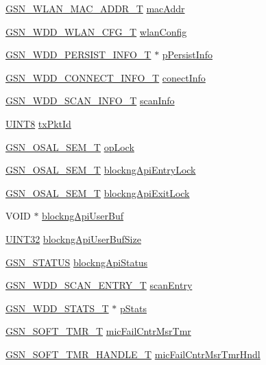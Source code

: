 \begin{DoxyCompactItemize}
\hyperlink{a00416}{GSN\_\-WLAN\_\-MAC\_\-ADDR\_\-T} \hyperlink{a00108_ab623c15c7dc79be51bcdaa04fba67d90}{macAddr}
\item 
\hyperlink{a00302}{GSN\_\-WDD\_\-WLAN\_\-CFG\_\-T} \hyperlink{a00108_a003dc28005c9736d062b26e04ed75e68}{wlanConfig}
\item 
\hyperlink{a00282}{GSN\_\-WDD\_\-PERSIST\_\-INFO\_\-T} $\ast$ \hyperlink{a00108_a2352b6f9dfcf66ea61b2b20760fed0c4}{pPersistInfo}
\item 
\hyperlink{a00273}{GSN\_\-WDD\_\-CONNECT\_\-INFO\_\-T} \hyperlink{a00108_ad5c6e8d12ebc9a7497ba35d144a5f19f}{conectInfo}
\item 
\hyperlink{a00285}{GSN\_\-WDD\_\-SCAN\_\-INFO\_\-T} \hyperlink{a00108_a32138fdd69edb3149046cfcc175dba89}{scanInfo}
\item 
\hyperlink{a00660_gab27e9918b538ce9d8ca692479b375b6a}{UINT8} \hyperlink{a00108_affebddbb049ab8a43e825575d648358b}{txPktId}
\item 
\hyperlink{a00628_gab4b3554407ce22b940e2fcd3faf5fd47}{GSN\_\-OSAL\_\-SEM\_\-T} \hyperlink{a00108_af54b39138c2e6c795c0f67af296e8235}{opLock}
\item 
\hyperlink{a00628_gab4b3554407ce22b940e2fcd3faf5fd47}{GSN\_\-OSAL\_\-SEM\_\-T} \hyperlink{a00108_a1375db10dcc5c2669543b8bdea7c9294}{blockngApiEntryLock}
\item 
\hyperlink{a00628_gab4b3554407ce22b940e2fcd3faf5fd47}{GSN\_\-OSAL\_\-SEM\_\-T} \hyperlink{a00108_ad31b28c2c1d66a49676adefa0939184e}{blockngApiExitLock}
\item 
VOID $\ast$ \hyperlink{a00108_a578079528c6283b8779beb3a12945bf9}{blockngApiUserBuf}
\item 
\hyperlink{a00660_gae1e6edbbc26d6fbc71a90190d0266018}{UINT32} \hyperlink{a00108_ad828642fbf78687924f94c89931c9e13}{blockngApiUserBufSize}
\item 
\hyperlink{a00660_gada5951904ac6110b1fa95e51a9ddc217}{GSN\_\-STATUS} \hyperlink{a00108_a9058d044509dc3901de07c426d816472}{blockngApiStatus}
\item 
\hyperlink{a00400}{GSN\_\-WDD\_\-SCAN\_\-ENTRY\_\-T} \hyperlink{a00108_a277d09bbbced06de868965eda9b7d06b}{scanEntry}
\item 
\hyperlink{a00301}{GSN\_\-WDD\_\-STATS\_\-T} $\ast$ \hyperlink{a00108_a2025526a9c36139e30df4edb6fe32c64}{pStats}
\item 
\hyperlink{a00229}{GSN\_\-SOFT\_\-TMR\_\-T} \hyperlink{a00108_a0ac3781f10e47c3830983ed0d9603359}{micFailCntrMsrTmr}
\item 
\hyperlink{a00229}{GSN\_\-SOFT\_\-TMR\_\-HANDLE\_\-T} \hyperlink{a00108_a1cdf001bbd447a958d6b1328c1a28c41}{micFailCntrMsrTmrHndl}

\end{DoxyCompactItemize}
